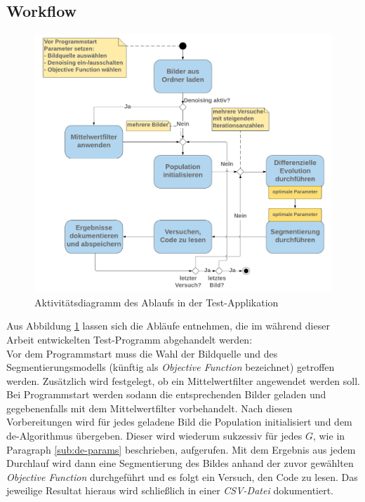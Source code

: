 		\subsection{Workflow}
		\label{sub:workflow}
			\begin{figure}[H]
				\centering
				\includegraphics[width=\linewidth]{diff-evol-activity}
				\caption{Aktivitätsdiagramm des Ablaufs in der Test-Applikation}
				\label{fig:diff-evol-activity}
			\end{figure}
			Aus Abbildung \ref{fig:diff-evol-activity} lassen sich die Abläufe entnehmen, die im während dieser Arbeit entwickelten Test-Programm abgehandelt werden:\\
			Vor dem Programmstart muss die Wahl der Bildquelle und des Segmentierungsmodells (künftig als \textit{Objective Function} bezeichnet) getroffen werden. Zusätzlich wird festgelegt, ob ein Mittelwertfilter angewendet werden soll. \\
			Bei Programmstart werden sodann die entsprechenden Bilder geladen und gegebenenfalls mit dem Mittelwertfilter vorbehandelt. Nach diesen Vorbereitungen wird für jedes geladene Bild die Population initialisiert und dem \gls{de}-Algorithmus übergeben. Dieser wird wiederum sukzessiv für jedes $G$, wie in Paragraph \ref{sub:de-params} beschrieben, aufgerufen. Mit dem Ergebnis aus jedem Durchlauf wird dann eine Segmentierung des Bildes anhand der zuvor gewählten \textit{Objective Function} durchgeführt und es folgt ein Versuch, den Code zu lesen. Das jeweilige Resultat hieraus wird schließlich in einer \textit{CSV-Datei} dokumentiert.
	
